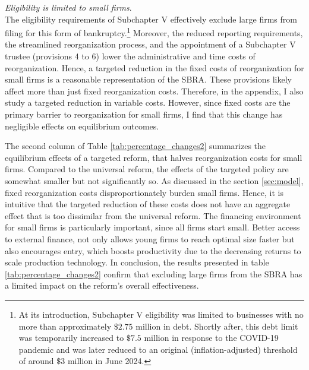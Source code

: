 \documentclass[12pt]{article}
\begin{document}
\noindent \textit{Eligibility is limited to small firms}. \\ 
The eligibility requirements of Subchapter V effectively exclude large firms from filing for this form of bankruptcy.\footnote{At its introduction, Subchapter V eligibility was limited to businesses with no more than approximately $\$2.75$ million in debt. Shortly after, this debt limit was temporarily increased to $\$7.5$ million in response to the COVID-19 pandemic and was later reduced to an original (inflation-adjusted) threshold of around $\$3$ million in June 2024.} Moreover, the reduced reporting requirements, the streamlined reorganization process, and the appointment of a Subchapter V trustee (provisions 4 to 6) lower the administrative and time costs of reorganization. Hence, a targeted reduction in the fixed costs of reorganization for small firms is a reasonable representation of the SBRA. These provisions likely affect more than just fixed reorganization costs. Therefore, in the appendix, I also study a targeted reduction in variable costs. However, since fixed costs are the primary barrier to reorganization for small firms, I find that this change has negligible effects on equilibrium outcomes.

The second column of Table \ref{tab:percentage_changes2} summarizes the equilibrium effects of a targeted reform, that halves reorganization costs for small firms. Compared to the universal reform, the effects of the targeted policy are somewhat smaller but not significantly so. As discussed in the section \ref{sec:model}, fixed reorganization costs disproportionately burden small firms. Hence, it is intuitive that the targeted reduction of these costs does not have an aggregate effect that is too dissimilar from the universal reform. The financing environment for small firms is particularly important, since all firms start small. Better access to external finance, not only allows young firms to reach optimal size faster but also encourages entry, which boosts productivity due to the decreasing returns to scale production technology. In conclusion, the results presented in table \ref{tab:percentage_changes2} confirm that excluding large firms from the SBRA has a limited impact on the reform's overall effectiveness. \vspace{3mm} 
\end{document}
